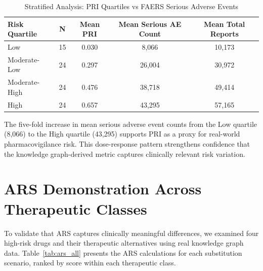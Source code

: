 \documentclass[11pt,a4paper]{article}
\begin{document}
\begin{table}[H]
\centering
\caption{Stratified Analysis: PRI Quartiles vs FAERS Serious Adverse Events}
\label{tab:stratified_validation}
\begin{tabular}{lcccc}
\toprule
\textbf{Risk Quartile} & \textbf{N} & \textbf{Mean PRI} & \textbf{Mean Serious AE Count} & \textbf{Mean Total Reports} \\
\midrule
Low & 15 & 0.030 & 8,066 & 10,173 \\
Moderate-Low & 24 & 0.297 & 26,004 & 30,972 \\
Moderate-High & 24 & 0.476 & 38,718 & 49,414 \\
High & 24 & 0.657 & 43,295 & 57,165 \\
\bottomrule
\end{tabular}
\end{table}

The five-fold increase in mean serious adverse event counts from the Low quartile (8,066) to the High quartile (43,295) supports PRI as a proxy for real-world pharmacovigilance risk. This dose-response pattern strengthens confidence that the knowledge graph-derived metric captures clinically relevant risk variation.

\section{ARS Demonstration Across Therapeutic Classes}

To validate that ARS captures clinically meaningful differences, we examined four high-risk drugs and their therapeutic alternatives using real knowledge graph data. Table~\ref{tab:ars_all} presents the ARS calculations for each substitution scenario, ranked by score within each therapeutic class.
\end{document}
